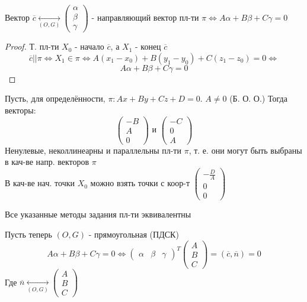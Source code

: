 \begin{consequence}
Вектор $\overline{c} \underset{(O, G)}{\longleftrightarrow} \begin{pmatrix} \alpha \\ \beta \\ \gamma \end{pmatrix}$ - направляющий вектор пл-ти $\pi \iff A\alpha + B\beta + C\gamma = 0$
\end{consequence}
\begin{proof}
Т. пл-ти $X_0$ - начало $\overline{c}$, а $X_1$ - конец $\overline{c}$
\[
\overline{c} || \pi \iff X_1 \in \pi \iff A(x_1 - x_0) + B(y_1 - y_0) + C(z_1 - z_0) = 0 \iff
\]
\[
A\alpha + B\beta + C\gamma = 0
\]
\end{proof}
\begin{consequence}
Пусть, для определённости, $\pi \colon Ax + By + Cz + D = 0$. $A \neq 0$ (Б. О. О.) Тогда векторы:
\[
\begin{pmatrix} -B \\ A \\ 0 \end{pmatrix} \text{ и } \begin{pmatrix}-C \\ 0 \\ A \end{pmatrix}
\]
Ненулевые, неколлинеарны и параллельны пл-ти $\pi$, т. е. они могут быть выбраны в кач-ве напр. векторов $\pi$ \\

В кач-ве нач. точки $X_0$ можно взять точки с коор-т $\begin{pmatrix}-\frac{D}{A} \\ 0 \\ 0\end{pmatrix}$
\end{consequence}
\begin{consequence}
Все указанные методы задания пл-ти эквивалентны 
\end{consequence}
Пусть теперь $(O, G)$ - прямоугольная (ПДСК)
\[
  A\alpha + B\beta + C\gamma = 0 \iff \begin{pmatrix} \alpha & \beta & \gamma \end{pmatrix}^{T} \begin{pmatrix} A \\ B \\ C \end{pmatrix} = (\overline{c}, \overline{n}) = 0
\]
Где $\overline{n} \underset{(O, G)}{\longleftrightarrow} \begin{pmatrix}A \\ B \\ C \end{pmatrix}$

